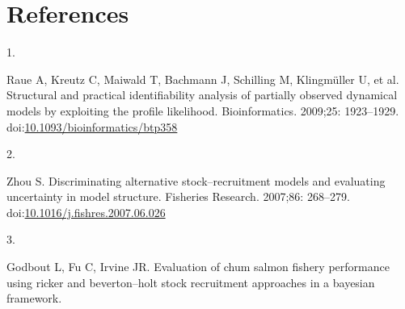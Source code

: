 \documentclass[10pt,letterpaper]{article}
\newlength{\cslhangindent}
\newlength{\csllabelwidth}
\newenvironment{CSLReferences}[2] %
 {\begin{list}{}{%
  \setlength{\itemindent}{0pt}
  \setlength{\leftmargin}{0pt}
  \setlength{\parsep}{0pt}
  \ifodd #1
   \setlength{\leftmargin}{\cslhangindent}
   \setlength{\itemindent}{-1\cslhangindent}
  \fi
  \setlength{\itemsep}{#2\baselineskip}}}
 {\end{list}}
\newcommand{\CSLLeftMargin}[1]{\parbox[t]{\csllabelwidth}{#1}}
\newcommand{\CSLRightInline}[1]{\parbox[t]{\linewidth - \csllabelwidth}{#1}\break}
\begin{document}
\section*{References}\label{references}

\label{refs}
\begin{CSLReferences}{0}{1}
\CSLLeftMargin{1. }%
\CSLRightInline{Raue A, Kreutz C, Maiwald T, Bachmann J, Schilling M,
Klingmüller U, et al. Structural and practical identifiability analysis
of partially observed dynamical models by exploiting the profile
likelihood. Bioinformatics. 2009;25: 1923--1929.
doi:\href{https://doi.org/10.1093/bioinformatics/btp358}{10.1093/bioinformatics/btp358}}

\CSLLeftMargin{2. }%
\CSLRightInline{Zhou S. Discriminating alternative stock--recruitment
models and evaluating uncertainty in model structure. Fisheries
Research. 2007;86: 268--279.
doi:\href{https://doi.org/10.1016/j.fishres.2007.06.026}{10.1016/j.fishres.2007.06.026}}

\CSLLeftMargin{3. }%
\CSLRightInline{Godbout L, Fu C, Irvine JR. Evaluation of chum salmon
fishery performance using ricker and beverton--holt stock recruitment
approaches in a bayesian framework. }

\end{CSLReferences}

\nolinenumbers
\end{document}
